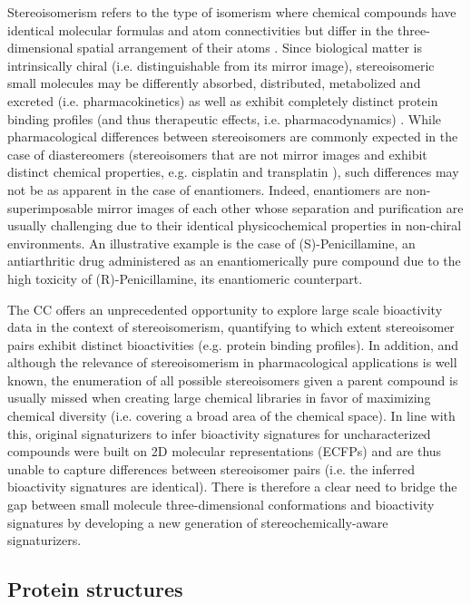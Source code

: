 Stereoisomerism refers to the type of isomerism where chemical compounds have identical molecular formulas and atom connectivities but differ in the three-dimensional spatial arrangement of their atoms \cite{gold_iupac_2019}. Since biological matter is intrinsically chiral (i.e. distinguishable from its mirror image), stereoisomeric small molecules may be differently absorbed, distributed, metabolized and excreted (i.e. pharmacokinetics) as well as exhibit completely distinct protein binding profiles (and thus therapeutic effects, i.e. pharmacodynamics) \cite{inaki_cell_2016, mcconathy_stereochemistry_2003}. While pharmacological differences between stereoisomers are commonly expected in the case of diastereomers (stereoisomers that are not mirror images and exhibit distinct chemical properties, e.g. cisplatin and transplatin \cite{dasari_cisplatin_2014, trudu_coordination_2015}), such differences may not be as apparent in the case of enantiomers. Indeed, enantiomers are non-superimposable mirror images of each other whose separation and purification are usually challenging due to their identical physicochemical properties in non-chiral environments\cite{ward_chiral_2012}. An illustrative example is the case of (S)-Penicillamine, an antiarthritic drug administered as an enantiomerically pure compound due to the high toxicity of (R)-Penicillamine, its enantiomeric counterpart\cite{aronson_meylers_2010}. 

The CC offers an unprecedented opportunity to explore large scale bioactivity data in the context of stereoisomerism, quantifying to which extent stereoisomer pairs exhibit distinct bioactivities (e.g. protein binding profiles). In addition, and although the relevance of stereoisomerism in pharmacological applications is well known, the enumeration of all possible stereoisomers given a parent compound is usually missed when creating large chemical libraries in favor of maximizing chemical diversity (i.e. covering a broad area of the chemical space)\cite{ruddigkeit_enumeration_2012}. In line with this, original signaturizers to infer bioactivity signatures for uncharacterized compounds were built on 2D molecular representations (ECFPs) and are thus unable to capture differences between stereoisomer pairs (i.e. the inferred bioactivity signatures are identical). There is therefore a clear need to bridge the gap between small molecule three-dimensional conformations and bioactivity signatures by developing a new generation of stereochemically-aware signaturizers.

\subsection{Protein structures}
\label{Introduction_proteinstructures}

